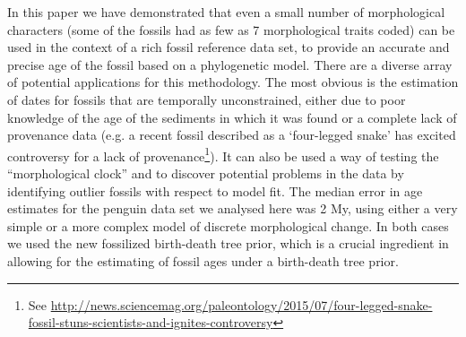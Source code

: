 \documentclass[11pt]{article}
\begin{document}
In this paper we have demonstrated that even a small number of morphological characters (some of the fossils had as few as 7 morphological traits coded) can be used in the context of a rich fossil reference data set, to provide an accurate and precise age of the fossil based on a phylogenetic model. 
There are a diverse array of potential applications for this methodology. 
The most obvious is the estimation of dates for fossils that are temporally unconstrained, either due to poor knowledge of the age of the sediments in which it was found or a complete lack of provenance data (e.g. a recent fossil described as a `four-legged snake' has excited controversy for a lack of provenance\footnote{See \url{http://news.sciencemag.org/paleontology/2015/07/four-legged-snake-fossil-stuns-scientists-and-ignites-controversy}}). 
It can also be used a way of testing the ``morphological clock'' and to discover potential problems in the data by identifying outlier fossils with respect to model fit. 
The median error in age estimates for the penguin data set we analysed here was 2 My, using either a very simple or a more complex model of discrete morphological change. In both cases we used the new fossilized birth-death tree prior, which is a crucial ingredient in allowing for the estimating of fossil ages under a birth-death tree prior.

\printbibliography
\end{document}
